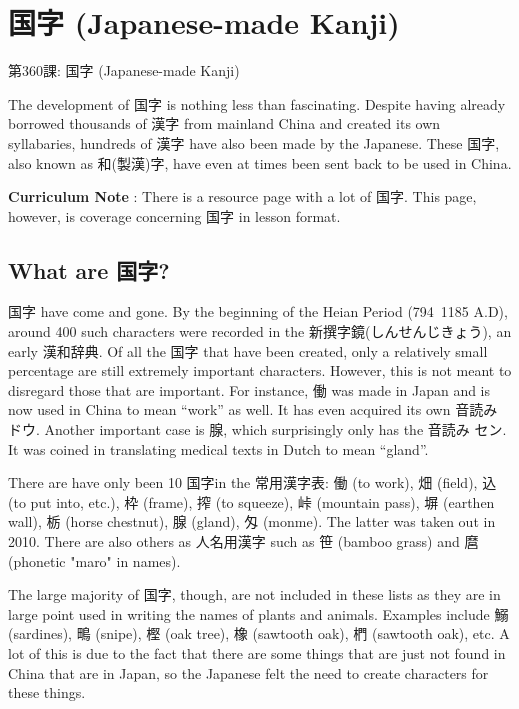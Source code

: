     
\chapter{国字 (Japanese-made Kanji)}

\begin{center}
\begin{Large}
第360課: 国字 (Japanese-made Kanji) 
\end{Large}
\end{center}
 
\par{ The development of 国字 is nothing less than fascinating. Despite having already borrowed thousands of 漢字 from mainland China and created its own syllabaries, hundreds of 漢字 have also been made by the Japanese. These 国字, also known as 和(製漢)字, have even at times been sent back to be used in China. }

\par{\textbf{Curriculum Note }: There is a resource page with a lot of 国字. This page, however, is coverage concerning 国字 in lesson format. }
      
\section{What are 国字?}
 
\par{ 国字 have come and gone. By the beginning of the Heian Period (794~1185 A.D), around 400 such characters were recorded in the 新撰字鏡(しんせんじきょう), an early 漢和辞典. Of all the 国字 that have been created, only a relatively small percentage are still extremely important characters. However, this is not meant to disregard those that are important. For instance, 働 was made in Japan and is now used in China to mean “work” as well. It has even acquired its own 音読み ドウ. Another important case is 腺, which surprisingly only has the 音読み セン. It was coined in translating medical texts in Dutch to mean “gland”. }

\par{There are have only been 10 国字in the 常用漢字表: 働 (to work), 畑 (field), 込 (to put into, etc.), 枠 (frame), 搾 (to squeeze), 峠 (mountain pass), 塀 (earthen wall), 栃 (horse chestnut), 腺 (gland), 匁 (monme). The latter was taken out in 2010. There are also others as 人名用漢字 such as 笹 (bamboo grass) and 麿 (phonetic "maro" in names). }

\par{ The large majority of 国字, though, are not included in these lists as they are in large point used in writing the names of plants and animals. Examples include 鰯 (sardines), 鴫 (snipe), 樫 (oak tree), 橡 (sawtooth oak), 椚 (sawtooth oak), etc. A lot of this is due to the fact that there are some things that are just not found in China that are in Japan, so the Japanese felt the need to create characters for these things. }
      

